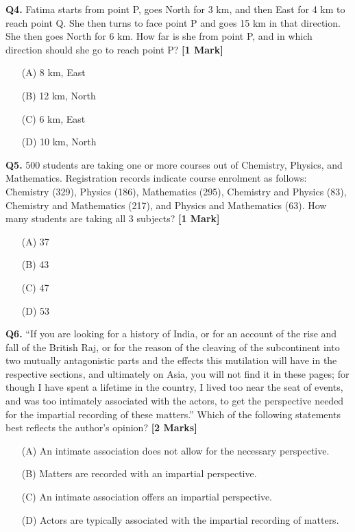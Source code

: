 \documentclass[11pt]{article}
\newcommand{\questiona}[2]{
    \noindent\textbf{Q#2.} #1 \hfill \textbf{[1 Mark]}
}
\newcommand{\questionb}[2]{
    \noindent\textbf{Q#2.} #1 \hfill \textbf{[2 Marks]}
}
\begin{document}
\questiona{Fatima starts from point P, goes North for 3 km, and then East for 4 km to reach point Q. She then turns to face point P and goes 15 km in that direction. She then goes North for 6 km. How far is she from point P, and in which direction should she go to reach point P?}{4}
\begin{enumerate}
    \item[(A)] 8 km, East
    \item[(B)] 12 km, North
    \item[(C)] 6 km, East
    \item[(D)] 10 km, North
\end{enumerate}
\vspace{0.5cm}

\questiona{500 students are taking one or more courses out of Chemistry, Physics, and Mathematics. Registration records indicate course enrolment as follows: Chemistry (329), Physics (186), Mathematics (295), Chemistry and Physics (83), Chemistry and Mathematics (217), and Physics and Mathematics (63). How many students are taking all 3 subjects?}{5}
\begin{enumerate}
    \item[(A)] 37
    \item[(B)] 43
    \item[(C)] 47
    \item[(D)] 53
\end{enumerate}
\vspace{0.5cm}

\questionb{``If you are looking for a history of India, or for an account of the rise and fall of the British Raj, or for the reason of the cleaving of the subcontinent into two mutually antagonistic parts and the effects this mutilation will have in the respective sections, and ultimately on Asia, you will not find it in these pages; for though I have spent a lifetime in the country, I lived too near the seat of events, and was too intimately associated with the actors, to get the perspective needed for the impartial recording of these matters.'' Which of the following statements best reflects the author's opinion?}{6}
\begin{enumerate}
    \item[(A)] An intimate association does not allow for the necessary perspective.
    \item[(B)] Matters are recorded with an impartial perspective.
    \item[(C)] An intimate association offers an impartial perspective.
    \item[(D)] Actors are typically associated with the impartial recording of matters.
\end{enumerate}
\vspace{0.5cm}
\end{document}
